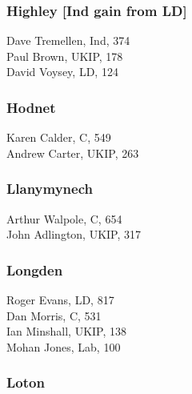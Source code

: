 \documentclass[a4paper,openany,10pt]{book}
\begin{document}
\subsubsection*{Highley \hspace*{\fill}\nolinebreak[1]%
\enspace\hspace*{\fill}
[Ind gain from LD]}



Dave Tremellen, Ind, 374\\
Paul Brown, UKIP, 178\\
David Voysey, LD, 124\\


\subsubsection*{Hodnet}



Karen Calder, C, 549\\
Andrew Carter, UKIP, 263\\


\subsubsection*{Llanymynech}



Arthur Walpole, C, 654\\
John Adlington, UKIP, 317\\


\subsubsection*{Longden}



Roger Evans, LD, 817\\
Dan Morris, C, 531\\
Ian Minshall, UKIP, 138\\
Mohan Jones, Lab, 100\\


\subsubsection*{Loton}

\end{document}
